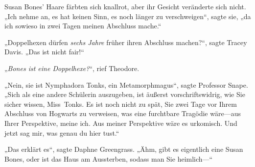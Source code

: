 Susan Bones' Haare färbten sich knallrot, aber ihr Gesicht veränderte sich nicht.
„Ich nehme an, es hat keinen Sinn, es noch länger zu verschweigen“, sagte sie, „da ich sowieso in zwei Tagen meinen Abschluss mache.“

„Doppelhexen dürfen \emph{sechs Jahre} früher ihren Abschluss machen?“, sagte Tracey Davis. „Das ist nicht fair!“

„\emph{Bones ist eine Doppelhexe?}“, rief Theodore.

„Nein, sie ist Nymphadora Tonks, ein Metamorphmagus“, sagte Professor Snape.
„Sich als eine andere Schülerin auszugeben, ist äußerst vorschriftswidrig, wie Sie sicher wissen, Miss~Tonks. Es ist noch nicht zu spät, Sie zwei Tage vor Ihrem Abschluss von Hogwarts zu verweisen, was eine furchtbare Tragödie wäre—aus Ihrer Perspektive, meine ich. Aus meiner Perspektive wäre es urkomisch. Und jetzt sag mir, was genau du hier tust.“

„Das erklärt es“, sagte Daphne Greengrass.
„Ähm, gibt es eigentlich eine Susan Bones, oder ist das Haus am Aussterben, sodass man Sie heimlich—“

